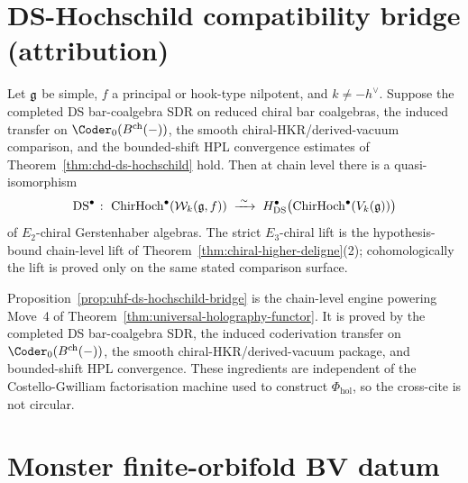 \section{DS-Hochschild compatibility bridge (attribution)}
\label{sec:uhf-ds-bridge}

\begin{proposition}
\label{prop:uhf-ds-hochschild-bridge}
Let $\mathfrak{g}$ be simple, $f$ a principal or hook-type nilpotent, and
$k \neq -h^\vee$.  Suppose the completed DS bar-coalgebra SDR on
reduced chiral bar coalgebras, the induced transfer on
\(\Coder_0(B^{\mathrm{ch}}(-))\), the smooth
chiral-HKR/derived-vacuum comparison, and the bounded-shift HPL
convergence estimates of
Theorem~\ref*{thm:chd-ds-hochschild} hold. Then at chain level there is
a quasi-isomorphism
\[
 \mathrm{DS}^\bullet \;\colon\;
 \mathrm{ChirHoch}^\bullet(\mathcal{W}_k(\mathfrak{g}, f))
 \;\xrightarrow{\;\sim\;}\;
 H^\bullet_{\mathrm{DS}}\bigl(\mathrm{ChirHoch}^\bullet(V_k(\mathfrak{g}))\bigr)
\]
of $E_2$-chiral Gerstenhaber algebras. The strict $E_3$-chiral lift is
the hypothesis-bound chain-level lift of
Theorem~\ref*{thm:chiral-higher-deligne}(2); cohomologically the lift
is proved only on the same stated comparison surface.
\end{proposition}

\begin{remark}
\label{rem:uhf-ds-role}
Proposition~\ref{prop:uhf-ds-hochschild-bridge} is the chain-level
engine powering Move~4 of
Theorem~\ref{thm:universal-holography-functor}. It is proved by the
completed DS bar-coalgebra SDR, the induced coderivation transfer on
\(\Coder_0(B^{\mathrm{ch}}(-))\), the smooth
chiral-HKR/derived-vacuum package, and bounded-shift HPL convergence.
These ingredients are independent of the Costello-Gwilliam
factorisation machine used to construct $\Phi_{\mathrm{hol}}$, so the
cross-cite is not circular.
\end{remark}

\section{Monster finite-orbifold BV datum}
\label{sec:uhf-monster}

